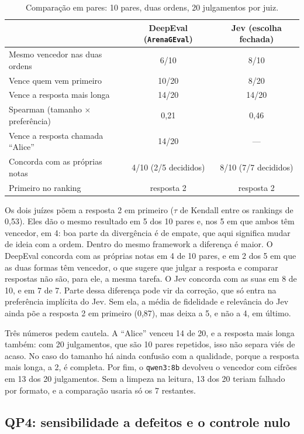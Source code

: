 \documentclass[12pt]{article}
\newcommand{\code}[1]{\texttt{\small #1}}
\begin{document}
\begin{table}[htb]
\centering
\small
\caption{Comparação em pares: 10 pares, duas ordens, 20 julgamentos por juiz.}
\label{tab:pares}
\begin{tabular}{@{}lcc@{}}
\toprule
 & DeepEval (\code{ArenaGEval}) & Jev (escolha fechada) \\
\midrule
Mesmo vencedor nas duas ordens    & 6/10  & 8/10 \\
Vence quem vem primeiro           & 10/20 & 8/20 \\
Vence a resposta mais longa       & 14/20 & 14/20 \\
Spearman (tamanho $\times$ preferência) & 0,21 & 0,46 \\
Vence a resposta chamada ``Alice'' & 14/20 & --- \\
Concorda com as próprias notas    & 4/10 (2/5 decididos) & 8/10 (7/7 decididos) \\
Primeiro no ranking               & resposta 2 & resposta 2 \\
\bottomrule
\end{tabular}
\end{table}

Os dois juízes põem a resposta 2 em primeiro ($\tau$ de Kendall entre os rankings de
0,53). Eles dão o mesmo resultado em 5 dos 10 pares e, nos 5 em que ambos têm vencedor,
em 4: boa parte da divergência é de empate, que aqui significa mudar de ideia com a ordem.
Dentro do mesmo framework a diferença é maior. O DeepEval concorda com as próprias notas
em 4 de 10 pares, e em 2 dos 5 em que as duas formas têm vencedor, o que sugere que julgar
a resposta e comparar respostas não são, para ele, a mesma tarefa. O Jev concorda com as
suas em 8 de 10, e em 7 de 7. Parte dessa diferença pode vir da correção, que só entra na preferência implícita do Jev. Sem ela, a média
de fidelidade e relevância do Jev ainda põe a resposta 2 em primeiro (0,87), mas
deixa a 5, e não a 4, em último.

Três números pedem cautela. A ``Alice'' venceu 14 de 20, e a resposta mais longa
também: com 20 julgamentos, que são 10 pares repetidos, isso não separa viés de
acaso. No caso do tamanho há ainda confusão com a qualidade, porque a resposta mais
longa, a 2, é completa. Por fim, o \code{qwen3:8b} devolveu o vencedor com cifrões
em 13 dos 20 julgamentos. Sem a limpeza na leitura, 13 dos 20 teriam falhado por
formato, e a comparação usaria só os 7 restantes.

\subsection{QP4: sensibilidade a defeitos e o controle nulo}
\end{document}
